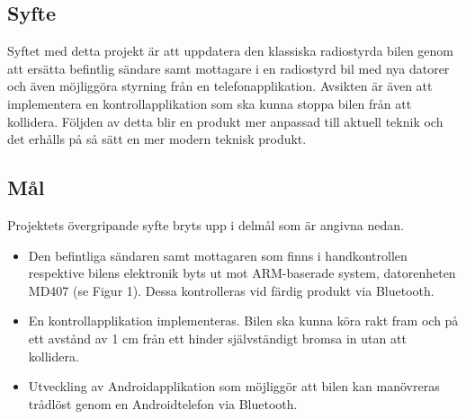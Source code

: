 \documentclass[a4paper]{article}
\begin{document}
\subsection{Syfte}

Syftet med detta projekt är att uppdatera den klassiska radiostyrda bilen genom att ersätta befintlig sändare samt mottagare i en radiostyrd bil med nya datorer och även möjliggöra styrning från en telefonapplikation. Avsikten är även att implementera en kontrollapplikation som ska kunna stoppa bilen från att kollidera. Följden av detta blir en produkt mer anpassad till aktuell teknik och det erhålls på så sätt en mer modern teknisk produkt.


\subsection{Mål}
Projektets övergripande syfte bryts upp i delmål som är angivna nedan.

\begin{itemize}
\item Den befintliga sändaren samt mottagaren som finns i handkontrollen respektive bilens elektronik byts ut mot ARM-baserade system, datorenheten MD407 (se Figur 1). Dessa kontrolleras vid färdig produkt via Bluetooth.
\item En kontrollapplikation implementeras. Bilen ska kunna köra rakt fram och på ett avstånd av 1 cm från ett hinder självständigt bromsa in utan att kollidera.
\item Utveckling av Androidapplikation som möjliggör att bilen kan manövreras trådlöst genom en Androidtelefon via Bluetooth.
\end{itemize}
\end{document}
